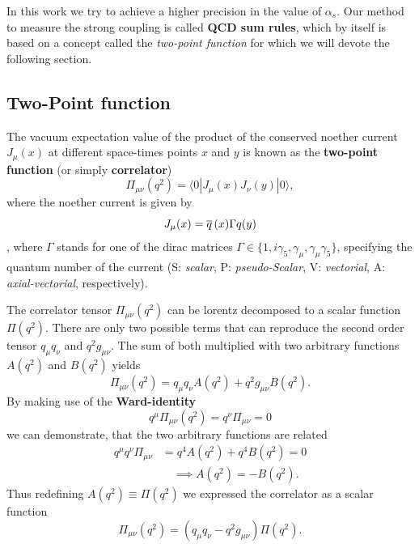 \documentclass[../../index.tex]{subfiles}
\begin{document}
In this work we try to achieve a higher precision in the value of $\alpha_s$.
Our method to measure the strong coupling is called \textbf{QCD sum rules},
which by itself is based on a concept called the \textit{two-point function} for
which we will devote the following section.

\subsection{Two-Point function}
\label{sec:twoPointFunction}
The vacuum expectation value of the product of the conserved noether current
$J_\mu(x)$ at different space-times points $x$ and $y$ is known as the
\textbf{two-point function} (or simply \textbf{correlator})
\begin{equation}
  \label{eq:twoPointFunction}
  \Pi_{\mu\nu}(q^2) = \langle  0 | J_\mu(x) J_\nu(y) | 0 \rangle,
\end{equation}
where the noether current is given by
\begin{equation}
  J_\mu(x) = \overline{q}\,(x) \Gamma q(y)
\end{equation}
, where $\Gamma$ stands for one of the dirac matrices $\Gamma \in \{ 1,
i\gamma_5, \gamma_\mu, \gamma_\mu\gamma_5\}$, specifying the quantum number of
the current (S: \textit{scalar}, P: \textit{pseudo-Scalar}, V:
\textit{vectorial}, A: \textit{axial-vectorial}, respectively).

The correlator tensor $\Pi_{\mu\nu}(q^2)$ can be lorentz decomposed to a scalar
function $\Pi(q^2)$. There are only two possible terms that can reproduce the
second order tensor $q_\mu q_\nu$ and $q^2 g_{\mu\nu}$. The sum of both
multiplied with two arbitrary functions $A(q^2)$ and $B(q^2)$ yields
\begin{equation}
  \Pi_{\mu\nu}(q^2) = q_\mu q_\nu A(q^2) + q^2 g_{\mu\nu} B(q^2).
\end{equation}
By making use of the \textbf{Ward-identity} \cite{Peskin1995}
\begin{equation}
  \label{eq:wardIdentity}
  q^\mu \Pi_{\mu\nu}(q^2) = q^\nu \Pi_{\mu\nu} = 0
\end{equation}
we can demonstrate, that the two arbitrary functions are related
\begin{equation}
  \begin{split}
    q^\mu q^\nu \Pi_{\mu\nu} &= q^4 A(q^2) + q^4 B(q^2) = 0 \\
    &\quad \implies A(q^2) = -B(q^2).
  \end{split}
\end{equation}
Thus redefining $A(q^2) \equiv \Pi(q^2)$ we expressed the correlator as a scalar
function
\begin{equation}
  \Pi_{\mu\nu}(q^2) = (q_\mu q_\nu - q^2 g_{\mu\nu})\Pi(q^2).
\end{equation}
\end{document}
